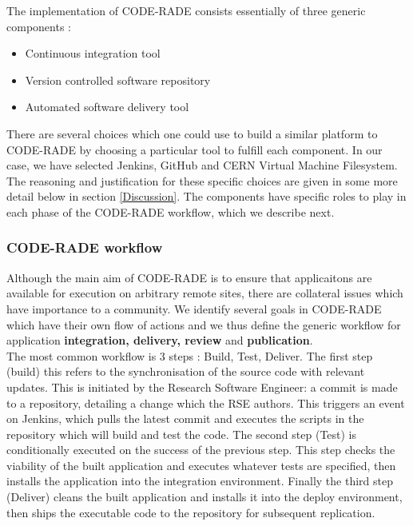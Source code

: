 \documentclass[a4paper]{jpconf}
\begin{document}
	The implementation of CODE-RADE consists essentially of three generic components :

	\begin{itemize}
		\item Continuous integration tool
		\item Version controlled software repository
		\item Automated software delivery tool
	\end{itemize}

    There are several choices  which one could use to build a similar platform to CODE-RADE by
    choosing a particular tool to fulfill each component. In our case, we have selected
    Jenkins\cite{Jenkins}, GitHub\cite{Github} and CERN Virtual Machine Filesystem\cite{CVMFS}. The
    reasoning and justification for these specific choices are given in some more detail below in
    section \ref{Discussion}. The components have specific roles to play in each phase of the
    CODE-RADE workflow, which we describe next.

	\subsubsection{CODE-RADE workflow}

    Although the main aim of CODE-RADE is to ensure that applicaitons are available for execution on
    arbitrary remote sites, there are collateral issues which have importance to a community. We
    identify several goals in CODE-RADE which have their own flow of actions and we thus define the
    generic workflow for application {\bf integration, delivery, review} and {\bf publication}.\\

	The most common workflow is 3 steps : Build, Test, Deliver.  
    The first step (build) this refers to the synchronisation of the source code with relevant
    updates. This is initiated by the Research Software Engineer: a commit is made to a repository,
    detailing a change which the RSE authors. This triggers an event on Jenkins, which pulls the
    latest commit and executes the scripts in the repository which will build and test the code. The
    second step (Test) is conditionally executed on the success of the previous step. This step checks
    the viability of the built application and executes whatever tests are specified, then installs
    the application into the integration environment. Finally the third step (Deliver) cleans the
    built application and installs it into the deploy environment, then ships the executable code to
    the repository for subsequent replication.
\end{document}
